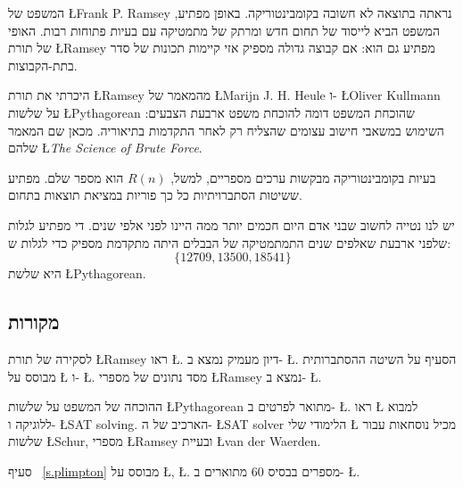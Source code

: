 המשפט של
\L{Frank P. Ramsey}
נראתה בתוצאה לא חשובה בקומבינטוריקה. באופן מפתיע, המשפט הביא לייסוד של תחום חדש ומרתק של מתמטיקה עם בעיות פתוחות רבות. האופי של תורת
\L{Ramsey}
מפתיע גם הוא: אם קבוצה גדולה מספיק אזי קיימות תכונות של סדר בתת-הקבוצות.

היכרתי את תורת 
\L{Ramsey}
מהמאמר של
\L{Marijn J. H. Heule}
ו-%
\L{Oliver Kullmann}
על שלשות
\L{Pythagorean}
שהוכחת המשפט דומה להוכחת משפט ארבעת הצבעים: השימוש במשאבי חישוב עצומים שהצליח רק לאחר התקדמות בתיאוריה. מכאן שם המאמר שלהם
\L{\textit{The Science of Brute Force}}.

בעיות בקומבינטוריקה מבקשות ערכים מספריים, למשל, 
$R(n)$
הוא מספר שלם. מפתיע ששיטות הסתברויתיות כל כך פוריות במציאת תוצאות בתחום.

יש לנו נטייה לחשוב שבני אדם היום חכמים יותר ממה היינו לפני אלפי שנים. די מפתיע לגלות שלפני ארבעת שאלפים שנים התמתמטיקה של הבבלים היתה מתקדמת מספיק כדי לגלות ש:
\[\{12709, 13500, 18541\}\]
היא שלשת
\L{Pythagorean}.

\subsection*{מקורות}

לסקירה של תורת
\L{Ramsey}
ראו
\L{\cite{burton}}.
דיון מעמיק נמצא ב-%
\L{\cite{rudiments}}.
הסעיף על השיטה ההסתברותית מבוסס על
\L{\cite[Example~4o]{ross}}
ו-%
\L{\cite[Chapter~4]{burton}}.
מסד נתונים של מספרי
\L{Ramsey}
נמצא ב-%
\L{\cite{mckay}}.

ההוכחה של המשפט על שלשות
\L{Pythagorean}
מתואר לפרטים ב-%
\L{\cite{brute}}.
ראו 
\L{\cite{mlcs}}
למבוא ללוגיקה ו-%
\L{SAT solving}.
הארכיב של ה-%
\L{SAT solver}
הלימודי שלי 
\L{\cite{joss}}
מכיל נוסחאות עבור שלשות
\L{Schur}, 
מספרי
\L{Ramsey}
ובעיית
\L{van der Waerden}.

סעיף%
~\ref{s.plimpton}
מבוסס על
\L{\cite{wiki:plimpton}}, \L{\cite{robson}}. 
מספרים בבסיס
$60$
מתוארים ב-%
\L{\cite{wiki:sexagesimal}}.
